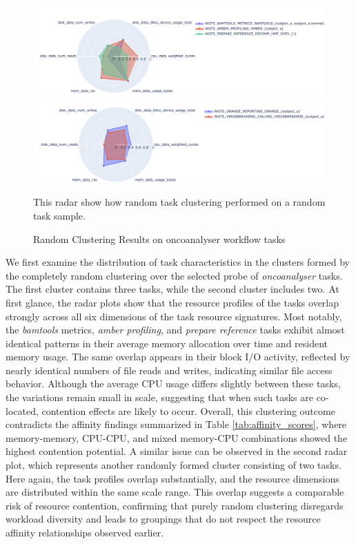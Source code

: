 \begin{figure}[H]
    \centering
    \includegraphics[scale=0.45]{fig/06/06-radarplot-random.png}
    \includegraphics[scale=0.45]{fig/06/06-radarplot-random-2.png}
    \small
    \caption{Random Clustering Results on oncoanalyser workflow tasks}
    \label{fig:radarplot_random}
    \tiny
    This radar show how random task clustering performed on a random task sample.
\end{figure}

We first examine the distribution of task characteristics in the clusters formed by the completely random clustering over the selected probe of \textit{oncoanalyser} tasks. The first cluster contains three tasks, while the second cluster includes two. At first glance, the radar plots show that the resource profiles of the tasks overlap strongly across all six dimensions of the task resource signatures. Most notably, the \textit{bamtools} metrics, \textit{amber profiling}, and \textit{prepare reference} tasks exhibit almost identical patterns in their average memory allocation over time and resident memory usage. The same overlap appears in their block I/O activity, reflected by nearly identical numbers of file reads and writes, indicating similar file access behavior.
Although the average CPU usage differs slightly between these tasks, the variations remain small in scale, suggesting that when such tasks are co-located, contention effects are likely to occur. Overall, this clustering outcome contradicts the affinity findings summarized in Table \ref{tab:affinity_scores}, where memory-memory, CPU-CPU, and mixed memory-CPU combinations showed the highest contention potential.
A similar issue can be observed in the second radar plot, which represents another randomly formed cluster consisting of two tasks. Here again, the task profiles overlap substantially, and the resource dimensions are distributed within the same scale range. This overlap suggests a comparable risk of resource contention, confirming that purely random clustering disregards workload diversity and leads to groupings that do not respect the resource affinity relationships observed earlier.

